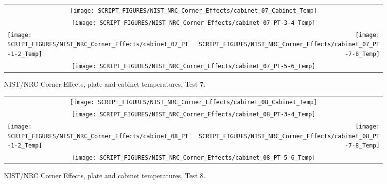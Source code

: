 \begin{figure}[p]
\begin{tabular*}{\textwidth}{l@{\extracolsep{\fill}}r}
\multicolumn{2}{c}{\texttt{[image: SCRIPT\_FIGURES/NIST\_NRC\_Corner\_Effects/cabinet\_07\_Cabinet\_Temp]}} \\
\multicolumn{2}{c}{\texttt{[image: SCRIPT\_FIGURES/NIST\_NRC\_Corner\_Effects/cabinet\_07\_PT-3-4\_Temp]}} \\
\texttt{[image: SCRIPT\_FIGURES/NIST\_NRC\_Corner\_Effects/cabinet\_07\_PT-1-2\_Temp]} &
\texttt{[image: SCRIPT\_FIGURES/NIST\_NRC\_Corner\_Effects/cabinet\_07\_PT-7-8\_Temp]} \\
\multicolumn{2}{c}{\texttt{[image: SCRIPT\_FIGURES/NIST\_NRC\_Corner\_Effects/cabinet\_07\_PT-5-6\_Temp]}}
\end{tabular*}
\caption[NIST/NRC Corner Effects, plate and cabinet temperatures, Test 7]{NIST/NRC Corner Effects, plate and cabinet temperatures, Test 7.}
\label{NIST_NRC_Cabinet_PT_Test_7}
\end{figure}

\begin{figure}[p]
\begin{tabular*}{\textwidth}{l@{\extracolsep{\fill}}r}
\multicolumn{2}{c}{\texttt{[image: SCRIPT\_FIGURES/NIST\_NRC\_Corner\_Effects/cabinet\_08\_Cabinet\_Temp]}} \\
\multicolumn{2}{c}{\texttt{[image: SCRIPT\_FIGURES/NIST\_NRC\_Corner\_Effects/cabinet\_08\_PT-3-4\_Temp]}} \\
\texttt{[image: SCRIPT\_FIGURES/NIST\_NRC\_Corner\_Effects/cabinet\_08\_PT-1-2\_Temp]} &
\texttt{[image: SCRIPT\_FIGURES/NIST\_NRC\_Corner\_Effects/cabinet\_08\_PT-7-8\_Temp]} \\
\multicolumn{2}{c}{\texttt{[image: SCRIPT\_FIGURES/NIST\_NRC\_Corner\_Effects/cabinet\_08\_PT-5-6\_Temp]}}
\end{tabular*}
\caption[NIST/NRC Corner Effects, plate and cabinet temperatures, Test 8]{NIST/NRC Corner Effects, plate and cabinet temperatures, Test 8.}
\label{NIST_NRC_Cabinet_PT_Test_8}
\end{figure}

